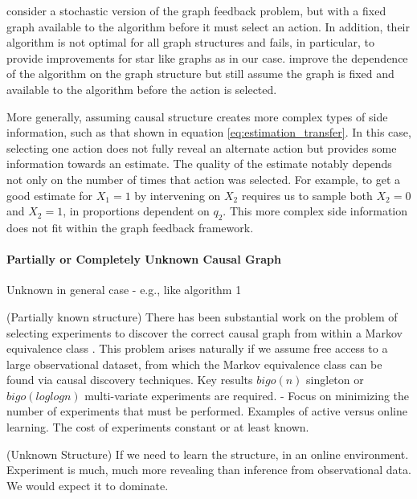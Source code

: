 \cite{Lelarge2012} consider a stochastic version of the graph feedback problem, but with a fixed graph available to the algorithm before it must select an action. In addition, their algorithm is not optimal for all graph structures and fails, in particular, to provide improvements for star like graphs as in our case. \cite{Buccapatnam2014} improve the dependence of the algorithm on the graph structure but still assume the graph is fixed and available to the algorithm before the action is selected. 

More generally, assuming causal structure creates more complex types of side information, such as that shown in equation \ref{eq:estimation_transfer}. In this case, selecting one action does not fully reveal an alternate action but provides some information towards an estimate. The quality of the estimate notably depends not only on the number of times that action was selected. For example, to get a good estimate for $X_1 = 1$ by intervening on $X_2$ requires us to sample both $X_2=0$ and $X_2=1$, in proportions dependent on $q_2$. This more complex side information does not fit within the graph feedback framework.



\paragraph{Partially or Completely Unknown Causal Graph}


Unknown in general case - e.g., like algorithm 1

(Partially known structure)
There has been substantial work on the problem of selecting experiments to discover the correct causal graph from within a Markov equivalence class \cite{Eberhardt2005,eberhardt2010causal,hauser2014two,Hu2014}. This problem arises naturally if we assume free access to a large observational dataset, from which the Markov equivalence class can be found via causal discovery techniques. Key results $bigo(n)$ singleton or $bigo(log log n)$ multi-variate experiments are required.
- Focus on minimizing the number of experiments that must be performed. Examples of active versus online learning. The cost of experiments constant or at least known. 

(Unknown Structure)
If we need to learn the structure, in an online environment. 
Experiment is much, much more revealing than inference from observational data. We would expect it to dominate. 


